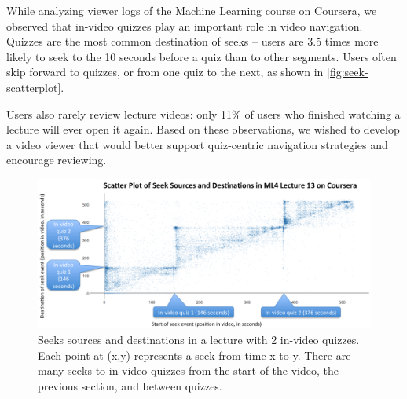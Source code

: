 \documentclass{chi-ext}
\begin{document}
While analyzing viewer logs of the Machine Learning course on Coursera, we observed that in-video quizzes play an important role in video navigation. Quizzes are the most common destination of seeks -- users are 3.5 times more likely to seek to the 10 seconds before a quiz than to other segments. Users often skip forward to quizzes, or from one quiz to the next, as shown in \autoref{fig:seek-scatterplot}.



Users also rarely review lecture videos: only 11\% of users who finished watching a lecture will ever open it again. Based on these observations, we wished to develop a video viewer that would better support quiz-centric navigation strategies and encourage reviewing.

\begin{figure}
\includegraphics[width=\columnwidth]{seek-scatterplot}
\caption{Seeks sources and destinations in a lecture with 2 in-video quizzes. Each point at (x,y) represents a seek from time x to y. There are many seeks to in-video quizzes from the start of the video, the previous section, and between quizzes.} %
\label{fig:seek-scatterplot}
\end{figure}
\end{document}
